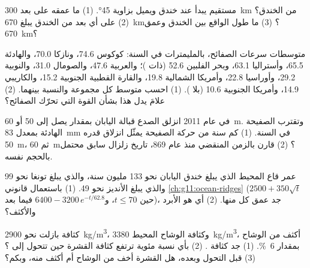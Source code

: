 \begin{exercise}[$\star\star$]\label{exo:g11:subduction-zones:7}
 مستقيم يبدأ عند خندق ويميل بزاوية \ang{45}. (1) ما عمقه على بعد
\qty{300}{km} من الخندق؟ (2) على أي بعد من الخندق
يبلغ \qty{670}{km}؟ (3) ما طول  الواقع بين الخندق
وعمق \qty{670}{km}؟
\end{exercise}

\begin{exercise}[$\star\star$]\label{exo:g11:subduction-zones:8}
متوسطات سرعات الصفائح، بالمليمترات في السنة: كوكوس 74.6، ونازكا
70.0، والهادئة 65.5، وأستراليا 63.1، وبحر الفلبين 52.6 (ذات )؛ والعربية
47.6، والصومال 31.0، والنوبية 29.2، وأوراسيا 22.8، وأمريكا الشمالية 19.8، والقارة القطبية الجنوبية
15.2، والكاريبي 14.9، وأمريكا الجنوبية 10.6 (بلا ). (1) احسب متوسط
كل مجموعة والنسبة بينهما. (2) علامَ يدل هذا بشأن القوة التي
تحرّك الصفائح؟
\end{exercise}

\begin{exercise}[$\star\star$]\label{exo:g11:subduction-zones:9}
في عام 2011 انزلق الصدع قبالة اليابان بمقدار يصل إلى 50 أو \qty{60}{m}.
وتقترب الصفيحة الهادئة بمعدل \qty{83}{mm} في السنة. (1) كم سنة من حركة الصفيحة
يمثّل انزلاق قدره \qty{50}{m}، ثم \qty{60}{m}؟ (2) قارن
بالزمن المنقضي منذ عام 869، تاريخ زلزال سابق محتمل بالحجم نفسه.
\end{exercise}

\begin{exercise}[$\star\star$]\label{exo:g11:subduction-zones:10}
عمر قاع المحيط الذي يبلغ خندق اليابان نحو 133 مليون سنة،
والذي يبلغ تونغا نحو 99 والذي يبلغ الأنديز نحو 49. (1) باستعمال
قانوني \cref{ch:g11:ocean-ridges} ($2500 + 350\sqrt{t}$ حين
$t \le 70$، و$6400 - 3200\,e^{-t/62.8}$ فيما بعد)، جد عمق كل منها. (2)
أي  هو الأبرد والأكثف؟
\end{exercise}

\begin{exercise}[$\star\star$]\label{exo:g11:subduction-zones:11}
كثافة بازلت  نحو \qty{2900}{kg/m^3}،
وكثافة الوشاح المحيط  \qty{3380}{kg/m^3}،  أكثف من الوشاح
بمقدار \qty{6}{\percent}. (1) جد كثافة .
(2) بأي نسبة مئوية ترتفع كثافة القشرة حين تتحول إلى
؟ (3) قبل التحول وبعده، هل القشرة أخف من الوشاح أم أكثف منه، وبكم؟
\end{exercise}

